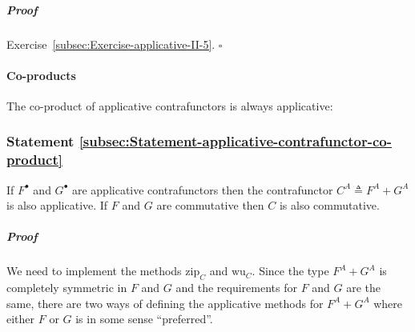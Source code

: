 \subparagraph{Proof}

Exercise~\ref{subsec:Exercise-applicative-II-5}. $\square$

\paragraph{Co-products}

The co-product of applicative contrafunctors is always applicative: 

\subsubsection{Statement \label{subsec:Statement-applicative-contrafunctor-co-product}\ref{subsec:Statement-applicative-contrafunctor-co-product}}

If $F^{\bullet}$ and $G^{\bullet}$ are applicative contrafunctors
then the contrafunctor $C^{A}\triangleq F^{A}+G^{A}$ is also applicative.
If $F$ and $G$ are commutative then $C$ is also commutative.

\subparagraph{Proof}

We need to implement the methods $\text{zip}_{C}$ and $\text{wu}_{C}$.
Since the type $F^{A}+G^{A}$ is completely symmetric in $F$ and
$G$ and the requirements for $F$ and $G$ are the same, there are
two ways of defining the applicative methods for $F^{A}+G^{A}$ where
either $F$ or $G$ is in some sense \textsf{``}preferred\textsf{''}.

